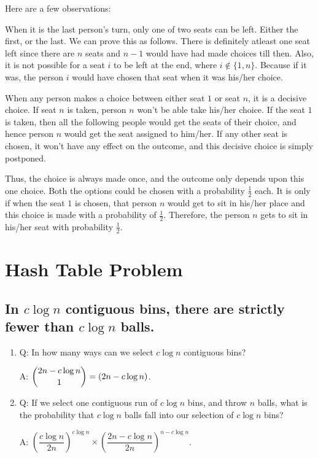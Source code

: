 \documentclass{article}
\begin{document}
Here are a few observations: 

When it is the last person's turn, only one of two seats can be left. 
Either the first, or the last. We can prove this as follows. There is definitely 
atleast one seat left since there are $n$ seats and $n-1$ would have had made 
choices till then. Also, it is not possible for a seat $i$ to be
left at the end, where $i \notin  \{ 1, n \}$. Because if it was, the person $i$ would
have chosen that seat when it was his/her choice. 

When any person makes a choice between either seat $1$ or seat $n$, it is a decisive choice.
If seat $n$ is taken, person $n$ won't be able take his/her choice. If the seat
$1$ is taken, then all the following people would get the seats of their choice, and
hence person $n$ would get the seat assigned to him/her. If any other seat is 
chosen, it won't have any effect on the outcome, and this decisive choice
is simply postponed. 

Thus, the choice is always made once, and the outcome only depends upon this one
choice. Both the options could be chosen with a probability $\frac{1}{2}$ each. It is
only if when the seat $1$ is chosen, that person $n$ would get to sit in his/her place
and this choice is made with a probability of $\frac{1}{2}$. Therefore, the person
$n$ gets to sit in his/her seat with probability $\frac{1}{2}$. 


\clearpage

\section{Hash Table Problem}
\subsection{In $c\log{n}$ contiguous bins, there are strictly
fewer than $c\log{n}$ balls.}
\begin{enumerate}

\item Q: In how many ways can we select $c\log{n}$ contiguous bins?

  A: $\dbinom{2n-c\log{n}}{1}  = (2n-c\log{n})$.

\item Q: If we select one contiguous run of $c\log{n}$ bins, and throw
  $n$ balls, what is the probability that $c\log{n}$ balls fall into
  our selection of $c\log{n}$ bins?

  A: $\left(\dfrac{c\log{n}}{2n}\right)^{c\log{n}} \times 
  \left( \dfrac{2n-c\log{n}}{2n} \right) ^{n-c\log{n}}$.

\end{enumerate}
\end{document}
